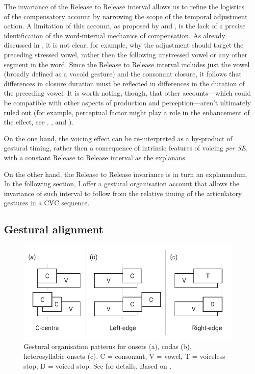 \documentclass[12pt,]{article}
\begin{document}
The invariance of the Release to Release interval allows us to refine
the logistics of the compensatory account by narrowing the scope of the
temporal adjustment action. A limitation of this account, as proposed by
\citet{slis1969} and \citet{lehiste1970}, is the lack of a precise
identification of the word-internal mechanics of compensation. As
already discussed in , it is not clear, for example, why
the adjustment should target the preceding stressed vowel, rather then
the following unstressed vowel or any other segment in the word. Since
the Release to Release interval includes just the vowel (broadly defined
as a vocoid gesture) and the consonant closure, it follows that
differences in closure duration must be reflected in differences in the
duration of the preceding vowel. It is worth noting, though, that other
accounts---which could be compatible with other aspects of production
and perception---aren't ultimately ruled out (for example, perceptual
factor might play a role in the enhancement of the effect, see
\citealt{kingston1994}, \citealt{port1982}, and \citealt{luce1985}).

On the one hand, the voicing effect can be re-interpreted as a
by-product of gestural timing, rather then a consequence of intrinsic
features of voicing \emph{per SE}, with a constant Release to Release
interval as the explanans.

On the other hand, the Release to Release invariance is in turn an
explanandum. In the following section, I offer a gestural organisation
account that allows the invariance of such interval to follow from the
relative timing of the articulatory gestures in a CV́C sequence.

\hypertarget{gestural-alignment}{%
\subsection{Gestural alignment}\label{gestural-alignment}}

\label{s:gestural}

\begin{figure}
  \centering
  \includegraphics[width=\linewidth]{img/Figure7.pdf}
  \caption{Gestural organisation patterns for onsets (a), codas (b), heterosyllabic onsets (c). C = consonant, V = vowel, T = voiceless stop, D = voiced stop. See  for details. Based on \citet{marin2010}.}
  \label{f:gorganisation}
\end{figure}
\end{document}
